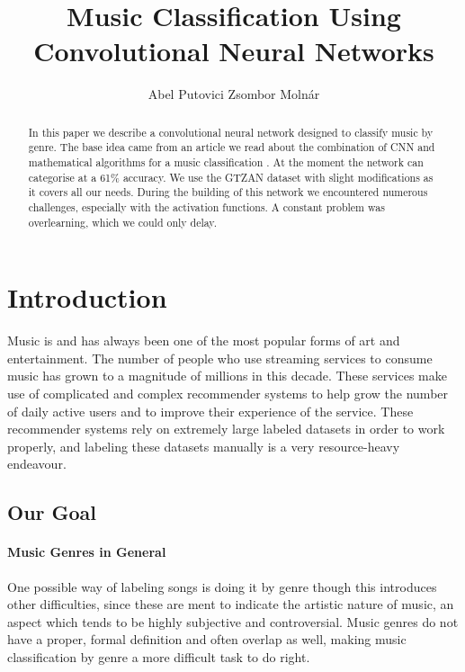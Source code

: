 \documentclass{article}
\title{Music Classification Using Convolutional Neural Networks}
\author{%
Abel Putovici\And
Zsombor Molnár
}
\begin{document}
    \maketitle

\begin{abstract}
	In this paper we describe a convolutional neural network designed to classify music by genre.
	The base idea came from an article we read about the combination of CNN and mathematical algorithms for a music classification \cite{sample}.
	At the moment the network can categorise at a 61\% accuracy.
	We use the GTZAN dataset with slight modifications as it covers all our needs.
	During the building of this network we encountered numerous challenges, especially with the activation functions.
	A constant problem was overlearning, which we could only delay. 
\end{abstract}


    \section{Introduction}

    Music is and has always been one of the most popular forms of art and
    entertainment. The number of people who use streaming services to consume music
    has grown to a magnitude of millions in this decade. These services make use of
    complicated and complex recommender systems to help grow the number of
    daily active users and to improve their experience of the service. These recommender
    systems rely on extremely large labeled datasets in order to work properly, and
    labeling these datasets manually is a very resource-heavy endeavour.

    \subsection{Our Goal}

    \paragraph{Music Genres in General}

    One possible way of labeling songs is doing it by genre though this introduces
    other difficulties, since these are ment to indicate the artistic nature of music, an
    aspect which tends to be highly subjective and controversial. Music genres do not have a
    proper, formal definition and often overlap as well, making music classification by
    genre a more difficult task to do right.
\end{document}
